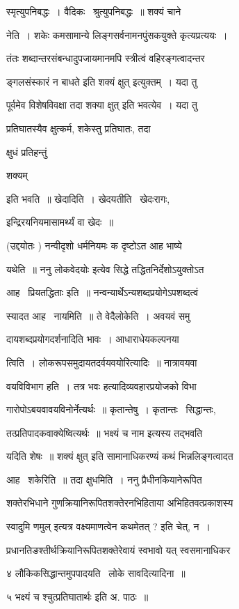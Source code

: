 \documentclass[11pt, openany]{book}
\begin{document}
स्मृत्युपनिबद्धः~। वैदिकः \textendash\ श्रुत्युपनिबद्धः~॥ शक्यं चाने \textendash\ 

नेति~। शकेः कमसामान्ये लिङ्गसर्वनामनपुंसकयुक्ते कृत्यप्रत्ययः~। 

तंतः शब्दान्तरसंबन्धादुपजायमानमपि स्त्रीत्वं वहिरङ्गत्वादन्तर \textendash\ 

ङ्गलसंस्कारं न बाधते इति {\qt शक्यं क्षुत्} इत्युक्तम्~। यदा तु 

पूर्वमेव विशेषविवक्षा तदा {\qt शक्या क्षुत्} इति भवत्येव~। यदा तु 

प्रतिघातस्यैव क्षुत्कर्म, शकेस्तु प्रतिघातः, तदा {\qt क्षुधं प्रतिहन्तुं 

शक्यम्} इति भवति~॥ खेदादिति~। खेदयतीति \textendash\ खेदःरागः, 

इन्द्रिरयनियमासामर्थ्यं वा खेदः~॥ 

(उद्दयोतः ) नन्वीदृशो धर्मनियमः क दृष्टोऽत आह भाष्ये \textendash\ 

यथेति~॥ ननु {\qt लोकवेदयोः} इत्येव सिद्धे तद्धितनिर्देशोऽयुक्तोऽत 

आह \textendash\ प्रियतद्धिताः इति~॥ नन्वन्यार्थेऽन्यशब्दप्रयोगेऽपशब्दत्वं 

स्यादत आह \textendash\ नायमिति~॥ ते वेदैलोकेति~। अवयवं समु \textendash\ 

दायशब्दप्रयोगदर्शनादिति भावः~। आधाराधेयकल्पनया 

त्विति~। लोकरूपसमुदायतदर्वयवयोरित्यादिः~॥ नात्रावयवा \textendash\ 

वयविविभाग हति~। {\qt तत्र भवः} हत्यादिव्यवहारप्रयोजको विभा \textendash\ 

गारोपोऽबयवावयविनोर्नेत्यर्थः~॥ कृतान्तेषु~। कृतान्तः \textendash\ सिद्धान्तः, 

तत्प्रतिपादकवाक्येष्वित्यर्थः~॥ {\qt भक्ष्यं च नाम} इत्यस्य तद्भवति 

यदिति शेषः~॥ {\qt शक्यं क्षुत्} इति सामानाधिकरण्यं कथं भिन्नलिङ्गत्वादत 

आह \textendash\ शकेरिति~॥ तदा क्षुधमिति~। ननु प्रैधीनकियानेरूपित \textendash\ 

शक्तेरभिधाने गुणक्रियानिरूपितशक्तेरनभिहिताया अभिहितवत्प्रकाशस्य 

{\qt स्वादुमि णमुल्} इत्यत्र वक्ष्यमाणत्वेन कथमेतत् ? इति चेत्, न~। 

प्रधानतिङश्तीर्थक्रियानिरूपितशक्तेरेवायं स्वभावो यत् स्वसमानाधिकर \textendash\ 



४ लौकिकसिद्धान्तमुपपादयति \textendash\ लोके सावदित्यादिना~॥ 

५ भक्ष्यं च श्चुत्प्रतिघातार्थः इति अ. पाठः~॥ 
\end{document}
